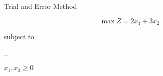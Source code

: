 \begin{frameExample}{Trial and Error Method}{}

\[    \max Z = 2x_1 + 3x_2  \]
{
  \centering
  subject to

  \sysdelim..%

  \vspace{5mm}
  $    x_1, x_2  \geq 0$
  \par
}
\end{frameExample}


